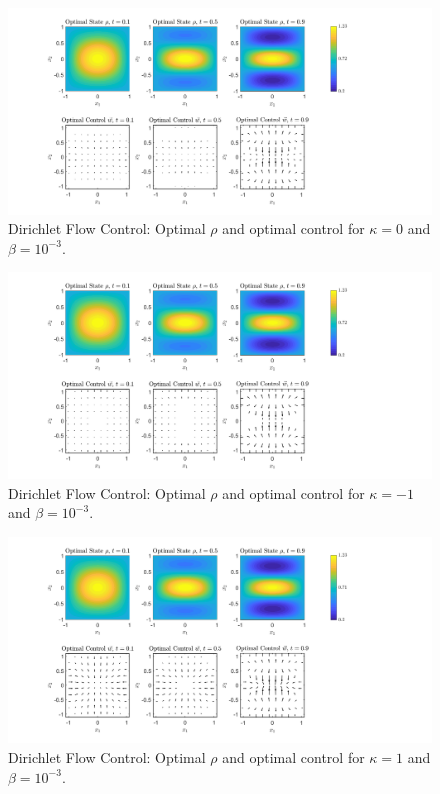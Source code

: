 \documentclass[11pt, a4paper]{article}
\theoremstyle{definition}
\begin{document}
	\begin{figure}[h]
		\centering
		\includegraphics[scale=0.35]{FcEx2k0.png}
		\caption{Dirichlet Flow Control: Optimal $\rho$ and optimal control for $\kappa = 0$ and $\beta = 10^{-3}$.} 
		\label{F4a}
	\end{figure}
	\begin{figure}[h]
		\centering
		\includegraphics[scale=0.35]{FcEx2kn1.png}
		\caption{Dirichlet Flow Control: Optimal $\rho$ and optimal control for $\kappa = -1$ and $\beta = 10^{-3}$.} 
		\label{F4b}
	\end{figure}
	\begin{figure}[h]
		\centering
		\includegraphics[scale=0.35]{FcEx2k1.png}
		\caption{Dirichlet Flow Control: Optimal $\rho$ and optimal control for $\kappa = 1$ and $\beta = 10^{-3}$.} 
		\label{F4c}
	\end{figure}
	
\end{document}

